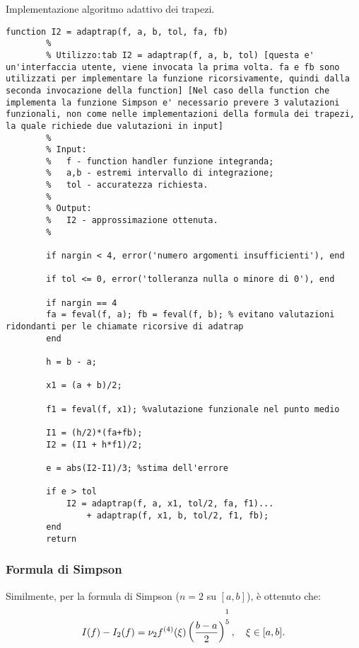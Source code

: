 \begin{algorithm}\caption{Implementazione algoritmo adattivo dei trapezi.}
	\label{alg:formula_trapezi_adattiva}
	\begin{lstlisting}[style=Matlab-editor]
		function I2 = adaptrap(f, a, b, tol, fa, fb)
		%
		% Utilizzo:tab I2 = adaptrap(f, a, b, tol) [questa e' un'interfaccia utente, viene invocata la prima volta. fa e fb sono utilizzati per implementare la funzione ricorsivamente, quindi dalla seconda invocazione della function] [Nel caso della function che implementa la funzione Simpson e' necessario prevere 3 valutazioni funzionali, non come nelle implementazioni della formula dei trapezi, la quale richiede due valutazioni in input]
		%
		% Input:
		%   f - function handler funzione integranda;
		%   a,b - estremi intervallo di integrazione;
		%   tol - accuratezza richiesta.
		%
		% Output:
		%   I2 - approssimazione ottenuta.
		%
		
		if nargin < 4, error('numero argomenti insufficienti'), end
		
		if tol <= 0, error('tolleranza nulla o minore di 0'), end 
		
		if nargin == 4
		fa = feval(f, a); fb = feval(f, b); % evitano valutazioni ridondanti per le chiamate ricorsive di adatrap 
		end
		
		h = b - a;
		
		x1 = (a + b)/2;
		
		f1 = feval(f, x1); %valutazione funzionale nel punto medio
		
		I1 = (h/2)*(fa+fb); 
		I2 = (I1 + h*f1)/2; 
		
		e = abs(I2-I1)/3; %stima dell'errore
		
		if e > tol
			I2 = adaptrap(f, a, x1, tol/2, fa, f1)...
				+ adaptrap(f, x1, b, tol/2, f1, fb); 
		end
		return
	\end{lstlisting}
\end{algorithm}

\subsubsection{Formula di Simpson}
Similmente, per la formula di Simpson ($n=2$ su $[a,b]$), è ottenuto che:
\begin{equation}\label{eq:stimaErrFormQuadSimpN=2}
    I(f)-I_2(f)=\nu_2 f^{(4)}(\xi)\left(\frac{b-a}{2}\right)^{\overset{\footnotemark}{5}},\quad \xi\in[a,b].
\end{equation}

